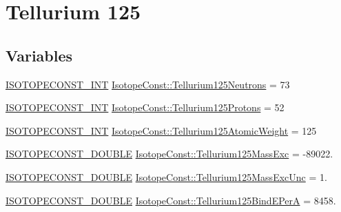 \hypertarget{group___isotope_const-_tellurium-_te125}{}\section{Tellurium 125}
\label{group___isotope_const-_tellurium-_te125}
\subsection*{Variables}
\begin{DoxyCompactItemize}
\item 
\mbox{\hyperlink{group___isotope_const-_macros_ga5f18360b3e99483a35c32d789e62621c}{I\+S\+O\+T\+O\+P\+E\+C\+O\+N\+S\+T\+\_\+\+I\+NT}} \mbox{\hyperlink{group___isotope_const-_tellurium-_te125_gac7b6463e38ec9553df78b642fa772021}{Isotope\+Const\+::\+Tellurium125\+Neutrons}} = 73
\item 
\mbox{\hyperlink{group___isotope_const-_macros_ga5f18360b3e99483a35c32d789e62621c}{I\+S\+O\+T\+O\+P\+E\+C\+O\+N\+S\+T\+\_\+\+I\+NT}} \mbox{\hyperlink{group___isotope_const-_tellurium-_te125_gae98a4c150c440569a700a167c1aa8755}{Isotope\+Const\+::\+Tellurium125\+Protons}} = 52
\item 
\mbox{\hyperlink{group___isotope_const-_macros_ga5f18360b3e99483a35c32d789e62621c}{I\+S\+O\+T\+O\+P\+E\+C\+O\+N\+S\+T\+\_\+\+I\+NT}} \mbox{\hyperlink{group___isotope_const-_tellurium-_te125_ga6c79c31eb71b437dca6c7b08a2fa30fe}{Isotope\+Const\+::\+Tellurium125\+Atomic\+Weight}} = 125
\item 
\mbox{\hyperlink{group___isotope_const-_macros_ga8f45a7272ce02c0b4c65c44636ed719a}{I\+S\+O\+T\+O\+P\+E\+C\+O\+N\+S\+T\+\_\+\+D\+O\+U\+B\+LE}} \mbox{\hyperlink{group___isotope_const-_tellurium-_te125_gafbf1d0b90bfa932ca4b53e2489e1c852}{Isotope\+Const\+::\+Tellurium125\+Mass\+Exc}} = -\/89022.
\item 
\mbox{\hyperlink{group___isotope_const-_macros_ga8f45a7272ce02c0b4c65c44636ed719a}{I\+S\+O\+T\+O\+P\+E\+C\+O\+N\+S\+T\+\_\+\+D\+O\+U\+B\+LE}} \mbox{\hyperlink{group___isotope_const-_tellurium-_te125_gabbc8d60340298edb46e873854b7493cd}{Isotope\+Const\+::\+Tellurium125\+Mass\+Exc\+Unc}} = 1.
\item 
\mbox{\hyperlink{group___isotope_const-_macros_ga8f45a7272ce02c0b4c65c44636ed719a}{I\+S\+O\+T\+O\+P\+E\+C\+O\+N\+S\+T\+\_\+\+D\+O\+U\+B\+LE}} \mbox{\hyperlink{group___isotope_const-_tellurium-_te125_ga64599edb8b5eec79331bc93f9956d3ed}{Isotope\+Const\+::\+Tellurium125\+Bind\+E\+PerA}} = 8458.
\item 

\end{DoxyCompactItemize}
